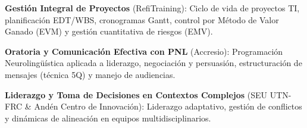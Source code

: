 


\begin{cvitems}
    \item \textbf{Gestión Integral de Proyectos} (RefiTraining): Ciclo de vida de proyectos TI, planificación EDT/WBS, cronogramas Gantt, control por Método de Valor Ganado (EVM) y gestión cuantitativa de riesgos (EMV).
    \item \textbf{Oratoria y Comunicación Efectiva con PNL} (Accresio): Programación Neurolingüística aplicada a liderazgo, negociación y persuasión, estructuración de mensajes (técnica 5Q) y manejo de audiencias.
    \item \textbf{Liderazgo y Toma de Decisiones en Contextos Complejos} (SEU UTN-FRC \& Andén Centro de Innovación): Liderazgo adaptativo, gestión de conflictos y dinámicas de alineación en equipos multidisciplinarios.
\end{cvitems}
